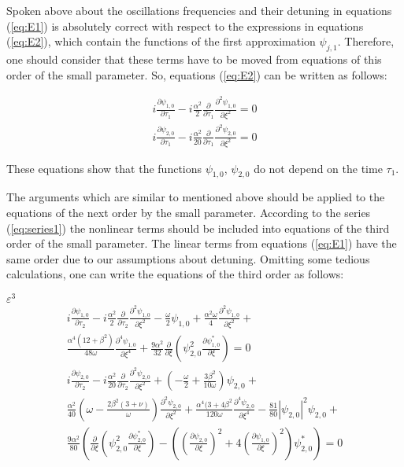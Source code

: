 Spoken above about the oscillations frequencies and their detuning in equations (\ref{eq:E1}) is absolutely correct with respect to the expressions in equations (\ref{eq:E2}), which contain the functions of the first approximation $\psi_{j,1}$. 
Therefore, one should consider that these terms have to be moved from equations of this order of the small parameter.
So, equations (\ref{eq:E2}) can be written as follows:

\begin{eqnarray}\label{eq;E2x}
i \frac{\partial \psi_{1,0}}{\partial \tau_{1}}   - i\frac{\alpha^2}{2} \frac{\partial }{\partial \tau_{1}} \frac{\partial^2 \psi_{1,0}}{\partial \xi^2} =0  \nonumber   \\
i \frac{\partial \psi_{2,0}}{\partial \tau_{1}}   - i\frac{\alpha^2}{20} \frac{\partial }{\partial \tau_{1}} \frac{\partial^2 \psi_{2,0}}{\partial \xi^2}  = 0
\end{eqnarray}

These equations show that the functions $\psi_{1,0}$, $\psi_{2,0}$ do not depend on the time $\tau_{1}$.

The arguments which are similar to mentioned above should be applied to the equations of the next order by the small parameter.
According to the series (\ref{eq:series1}) the nonlinear terms should be included into equations of the third order of the small parameter.
The linear terms from equations (\ref{eq:E1}) have the same order due to our assumptions about detuning.
Omitting some tedious calculations, one can write the equations of the third order  as follows:

$\varepsilon^3$
\begin{eqnarray}\label{eq:E3}
i \frac{\partial \psi_{1,0}}{\partial \tau_{2}}  - i\frac{\alpha^2}{2} \frac{\partial }{\partial \tau_{2}} \frac{\partial^2 \psi_{1,0}}{\partial \xi^2}  -   \frac{\omega}{2}  \psi_{1,0}+\frac{\alpha^2 \omega }{4} \frac{\partial^2 \psi_{1,0}}{\partial \xi^2}+  \nonumber  \\
\frac{\alpha^4 (12+\beta^2)}{48\omega} \frac{\partial^4 \psi_{1,0}}{\partial \xi^4 } +\frac{9 \alpha^2}{32} \frac{\partial}{\partial \xi} \left( \psi_{2,0}^2 \frac{\partial \psi_{1,0}^{*}}{\partial \xi} \right)=0 \nonumber \\
i \frac{\partial \psi_{2,0}}{\partial \tau_{2}}  - i\frac{\alpha^2}{20} \frac{\partial }{\partial \tau_{2}} \frac{\partial^2 \psi_{2,0}}{\partial \xi^2} + \left( -  \frac{\omega}{2}+\frac{3 \beta^2}{10 \omega} \right)  \psi_{2,0}+  \quad \qquad  \\   \frac{\alpha^2}{40} \left( \omega-\frac{2 \beta^2 (3+\nu)}{\omega} \right) \frac{\partial^2 \psi_{2,0}}{\partial \xi^2} +  \frac{\alpha^4 (3+4 \beta^2}{120 \omega} \frac{\partial^4 \psi_{2,0}}{\partial \xi^4} - \frac{81}{80} |\psi_{2,0}|^2 \psi_{2,0}+ \nonumber  \\
\frac{9 \alpha^2}{80} \left( \frac{\partial}{\partial \xi} \left( \psi_{2,0}^2 \frac{\partial \psi_{2,0}^{*}}{\partial \xi} \right) - \left( \left( \frac{\partial \psi_{2,0}}{\partial \xi} \right)^2 +4 \left( \frac{\partial \psi_{1,0}}{\partial \xi} \right)^2 \right) \psi_{2,0}^{*} \right) = 0  \nonumber
\end{eqnarray}

